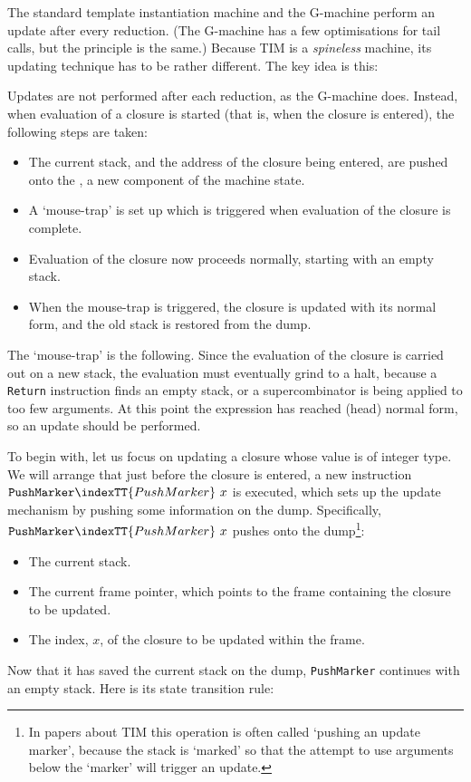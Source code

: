 The standard template instantiation machine and the G-machine
perform an update after every reduction.  (The G-machine has a few
optimisations for tail calls, but the principle is the same.)
Because TIM is a {\em spineless\/} machine,
its updating technique has to be rather different.
The key idea is this:
\begin{important}
Updates are not performed after each
reduction, as the G-machine does.
Instead,
when evaluation of a closure is started (that is, when
the closure is entered), the following steps are taken:
\begin{itemize}
\item
The current stack, and the address of the closure being entered,
are pushed onto the , a new component of the machine state.
\item
A `mouse-trap'
is set up which is triggered when evaluation of the closure
is complete.
\item
Evaluation of the closure now proceeds normally, starting with an empty stack.
\item
When the mouse-trap is triggered, the closure is updated with
its normal form, and the old stack is restored from the dump.
\end{itemize}
The `mouse-trap' is the following. Since the evaluation of the
closure is carried out on a new stack,
the evaluation must eventually grind to a halt, because
a \mbox{\tt Return} instruction finds an empty stack,
or a supercombinator is being applied to too few arguments.
At this point the expression
has reached (head) normal form, so an update should be performed.
\end{important}
To begin with, let us focus on updating a closure whose value is
of integer type.
We will arrange that just before the closure is entered, a new
instruction $\mbox{\tt PushMarker}\indexTT{PushMarker}~ x$ is executed, which sets up the update mechanism
by pushing some information on the dump.  Specifically, $\mbox{\tt PushMarker}\indexTT{PushMarker}~x$
pushes onto the dump\footnote{%
In papers about TIM this operation is often called `pushing an update
marker', because the stack is `marked' so that the attempt to
use arguments below the `marker' will trigger an update.
}:
\begin{itemize}
\item
The current stack.
\item
The current frame pointer, which points to the frame
containing the closure to be updated.
\item
The index, $x$, of the closure to be updated within the frame.
\end{itemize}
Now that it has saved the current stack on the dump,
\mbox{\tt PushMarker} continues with an empty stack.
Here is its state transition rule:
\timruleVD
{}
{}

